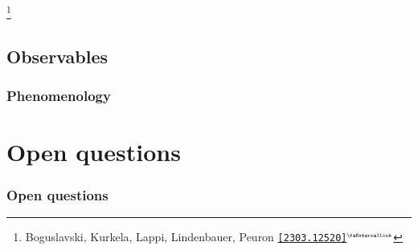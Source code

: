\documentclass[aspectratio=169,11pt,usenames,dvipsnames]{beamer}
\renewcommand{\thefootnote}{\color{customblue}\faPaperPlaneO}
\newcommand\blfootnote[1]{%
  \begingroup
  \renewcommand\thefootnote{}\footnote{#1}%
  \addtocounter{footnote}{-1}%
  \endgroup
}
\begin{document}
\begin{frame}[noframenumbering]
\begin{columns}[onlytextwidth,t]
\begin{figure}[!hbt]
        \end{figure}
    \end{columns}   
    \blfootnote{\scriptsize Boguslavski, Kurkela, Lappi, Lindenbauer, Peuron \href{https://arxiv.org/abs/2303.12520}{{\color{ForestGreen}\texttt{[2303.12520]}$^\text{\tiny\faExternalLink}$}}}
\end{frame}







\subsection{Observables}


\begin{frame}
    \frametitle{Phenomenology}
\end{frame}


\section{Open questions}



\begin{frame}
    \frametitle{Open questions}
\end{frame}
\end{document}
